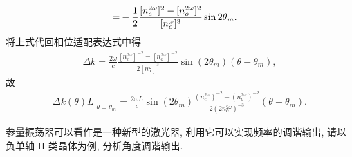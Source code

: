 \documentclass{assignment}
\begin{document}
\begin{pf}
\begin{align}
        \notag=&-\frac{1}{2}\frac{[n_e^{2\omega}]^2-[n_o^{2\omega}]^2}{[n_o^{\omega}]^3}\sin 2\theta_m.
    \end{align}
    将上式代回相位适配表达式中得
    \begin{align}
        \Delta k=\frac{2\omega}{c}\frac{[n_e^{2\omega}]^{-2}-[n_o^{2\omega}]^{-2}}{2[n_o^{\omega}]^3}\sin(2\theta_m)(\theta-\theta_m),
    \end{align}
    故
    \begin{align}
        \Delta k(\theta)L|_{\theta=\theta_m}=\frac{2\omega L}{c}\sin(2\theta_m)\frac{(n_e^{2\omega})^{-2}-(n_o^{2\omega})^{-2}}{2(2n_o^{2\omega})^{-3}}(\theta-\theta_m).
    \end{align}
\end{pf}

\begin{prob}
    参量振荡器可以看作是一种新型的激光器, 利用它可以实现频率的调谐输出, 请以负单轴 II 类晶体为例, 分析角度调谐输出.
\end{prob}
\end{document}
